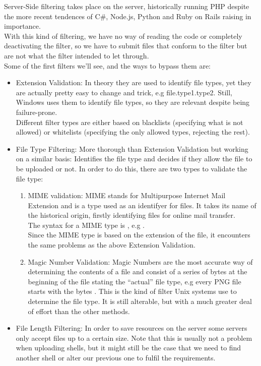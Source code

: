 {Server-Side filtering takes place on the server, historically running PHP despite the more recent tendences of C\#, Node.js, Python and Ruby on Rails raising in importance.\\
With this kind of filtering, we have no way of reading the code or completely deactivating the filter, so we have to submit files that conform to the filter but are not what the filter intended to let through.\\
Some of the first filters we'll see, and the ways to bypass them are:
\begin{itemize}
\item Extension Validation: In theory they are used to identify file types, yet they are actually pretty easy to change and trick, e.g file.type1.type2. Still, Windows uses them to identify file types, so they are relevant despite being failure-prone.\\
Different filter types are either based on blacklists (specifying what is not allowed) or whitelists (specifying the only allowed types, rejecting the rest). 
\item File Type Filtering: More thorough than Extension Validation but working on a similar basis: Identifies the file type and decides if they allow the file to be uploaded or not. In order to do this, there are two types to validate the file type: 
\begin{enumerate}
\item MIME validation: MIME stands for Multipurpose Internet Mail Extension and is a type used as an identifyer for files. It takes its name of the historical origin, firstly identifying files for online mail transfer. \\
The syntax for a MIME type is , e.g .\\
Since the MIME type is based on the extension of the file, it encounters the same problems as the above Extension Validation.
\item Magic Number Validation: Magic Numbers are the most accurate way of determining the contents of a file and consist of a series of bytes at the beginning of the file stating the ``actual'' file type, e.g every PNG file starts with the bytes . This is the kind of filter Unix systems use to determine the file type. It is still alterable, but with a much greater deal of effort than the other methods.
\end{enumerate}
\item File Length Filtering: In order to save resources on the server some servers only accept files up to a certain size. Note that this is usually not a problem when uploading shells, but it might still be the case that we need to find another shell or alter our previous one to fulfil the requirements.

\end{itemize}}
